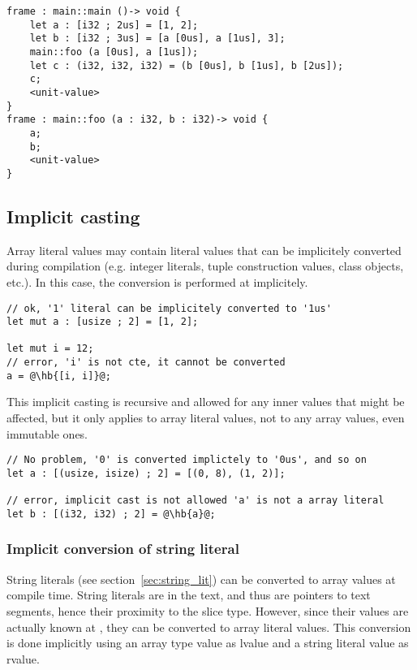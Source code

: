 \begin{lstlisting}[style=myilVerb]
frame : main::main ()-> void {
    let a : [i32 ; 2us] = [1, 2];
    let b : [i32 ; 3us] = [a [0us], a [1us], 3];
    main::foo (a [0us], a [1us]);
    let c : (i32, i32, i32) = (b [0us], b [1us], b [2us]);
    c;
    <unit-value>
}
frame : main::foo (a : i32, b : i32)-> void {
    a;
    b;
    <unit-value>
}
\end{lstlisting}


\subsection{Implicit casting}

Array literal values may contain literal values that can be implicitely
converted during compilation (e.g. integer literals, tuple construction values,
class objects, etc.). In this case, the conversion is performed at 
implicitely.

\begin{lstlisting}[style=coloredverbatim, escapechar=@]
// ok, '1' literal can be implicitely converted to '1us'
let mut a : [usize ; 2] = [1, 2];

let mut i = 12;
// error, 'i' is not cte, it cannot be converted
a = @\hb{[i, i]}@;
\end{lstlisting}

This implicit casting is recursive and allowed for any inner values that might
be affected, but it only applies to array literal values, not to any array
values, even immutable ones.

\begin{lstlisting}[style=coloredverbatim, escapechar=@]
// No problem, '0' is converted implictely to '0us', and so on
let a : [(usize, isize) ; 2] = [(0, 8), (1, 2)];

// error, implicit cast is not allowed 'a' is not a array literal
let b : [(i32, i32) ; 2] = @\hb{a}@;
\end{lstlisting}

\subsubsection{Implicit conversion of string literal}

String literals (see section~\ref{sec:string_lit}) can be converted to array
values at compile time. String literals are in the text, and thus are pointers to
text segments, hence their proximity to the slice type. However, since their
values are actually known at , they can be converted to array
literal values. This conversion is done implicitly using an array type value as
lvalue and a  string literal value as rvalue.

